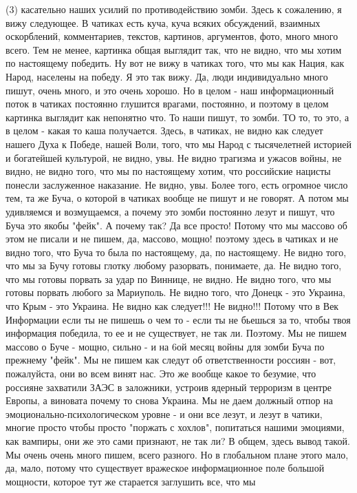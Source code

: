 (3) касательно наших усилий по противодействию зомби.  Здесь к сожалению, я
вижу следующее. В чатиках есть куча, куча всяких обсуждений, взаимных
оскорблений, комментариев, текстов, картинов, аргументов, фото, много много всего. Тем не менее,
картинка общая выглядит так, что не видно, что мы хотим по настоящему победить. 
Ну вот не вижу в чатиках того, что мы как Нация, как Народ, населены на победу.
Я это так вижу. Да, люди индивидуально много пишут, очень много, и это очень хорошо. Но в
целом - наш информационный поток в чатиках постоянно глушится врагами, постоянно, и
поэтому в целом картинка выглядит как непонятно что. То наши пишут, то зомби.
ТО то, то это, а в целом - какая то каша получается.  Здесь, в чатиках, не
видно как следует нашего Духа к Победе, нашей Воли, того, что мы Народ с
тысячелетней историей и богатейшей культурой, не видно, увы. Не видно трагизма и ужасов войны, не видно, не видно того, что мы по настоящему хотим, что российские нацисты понесли заслуженное наказание. Не видно, увы. Более того, есть
огромное число тем, та же Буча, о которой в чатиках вообще не пишут и не
говорят.  А потом мы удивляемся и возмущаемся, а почему это зомби постоянно лезут и пишут, что
Буча это якобы "фейк". А почему так?  Да все просто! Потому что мы массово об
этом не писали и не пишем, да, массово, мощно! поэтому здесь в чатиках и не видно того, что Буча то была по
настоящему, да, по настоящему. Не видно того, что мы за Бучу готовы глотку любому разорвать, понимаете, да. Не видно того, что мы готовы порвать за удар по Виннице, не видно. Не видно того, что мы готовы порвать любого за Мариуполь. Не видно того, что Донецк - это Украина, что Крым - это Украина. Не видно как следует!!! Не видно!!! Потому что в Век Информации если ты не пишешь о
чем то - если ты не бьешься за то, чтобы твоя информация победила, то ее и не
существует, не так ли. Поэтому. Мы не пишем массово о Буче - мощно, сильно - и
на 6ой месяц войны для зомби Буча по прежнему "фейк". Мы не пишем как следут об
ответственности россиян -  вот, пожалуйста, они во всем винят нас. Это же вообще какое то безумие, что россияне захватили ЗАЭС в заложники, устроив ядерный терроризм в центре Европы, а виновата почему то снова Украина. Мы не даем
должный отпор на эмоционально-психологическом уровне - и они все лезут, и лезут
в чатики, многие просто чтобы просто "поржать с хохлов", попитаться нашими эмоциями, как вампиры, они же это сами
признают, не так ли? В общем, здесь вывод такой. Мы очень очень много пишем,
всего разного. Но в глобальном плане этого мало, да, мало, потому что существует
вражеское информационное поле большой мощности, которое тут же старается заглушить все, что мы
